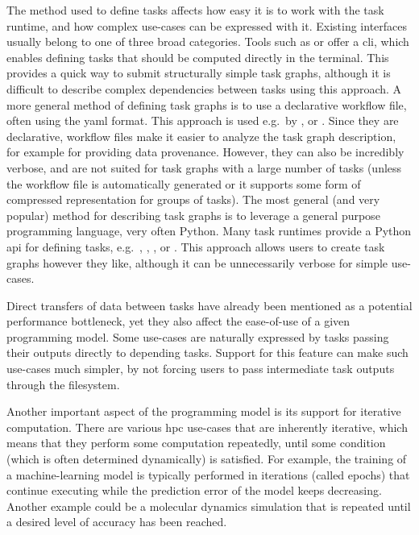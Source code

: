 \begin{description}[wide=0pt]
	\item[Task definition interfaces] The method used to define tasks affects how easy it is to work with the task runtime, and how
		complex use-cases can be expressed with it. Existing interfaces usually belong to one of three
		broad categories. Tools such as \gnuparallel{} or \hypershell{} offer a
		\gls{cli}, which enables defining tasks that should be computed directly in the
		terminal. This provides a quick way to submit structurally simple task graphs, although it is
		difficult to describe complex dependencies between tasks using this approach. A more general method
		of defining task graphs is to use a declarative workflow file, often using the
		\gls{yaml} format. This approach is used e.g.\ by \pegasus{},
		\autosubmit{} or \merlin{}. Since they are declarative, workflow files make
		it easier to analyze the task graph description, for example for providing data provenance.
		However, they can also be incredibly verbose, and are not suited for task graphs with a large
		number of tasks (unless the workflow file is automatically generated or it supports some form of
		compressed representation for groups of tasks). The most general (and very popular) method for
		describing task graphs is to leverage a general purpose programming language, very often Python.
		Many task runtimes provide a Python \gls{api} for defining tasks, e.g.\
		\dask{}, \ray{}, \parsl{}, \balsam{} or
		\pegasus{}. This approach allows users to create task graphs however they like,
		although it can be unnecessarily verbose for simple use-cases.

	\item[Data transfers] Direct transfers of data between tasks have already been mentioned as a potential performance
		bottleneck, yet they also affect the ease-of-use of a given programming model. Some use-cases are
		naturally expressed by tasks passing their outputs directly to depending tasks. Support for this
		feature can make such use-cases much simpler, by not forcing users to pass intermediate task
		outputs through the filesystem.

	\item[Iterative computation] Another important aspect of the programming model is its support for iterative computation. There
		are various \gls{hpc} use-cases that are inherently iterative, which means that they
		perform some computation repeatedly, until some condition (which is often determined dynamically)
		is satisfied. For example, the training of a machine-learning model is typically performed in
		iterations (called epochs) that continue executing while the prediction error of the model keeps
		decreasing. Another example could be a molecular dynamics simulation that is repeated until a
		desired level of accuracy has been reached.


\end{description}
